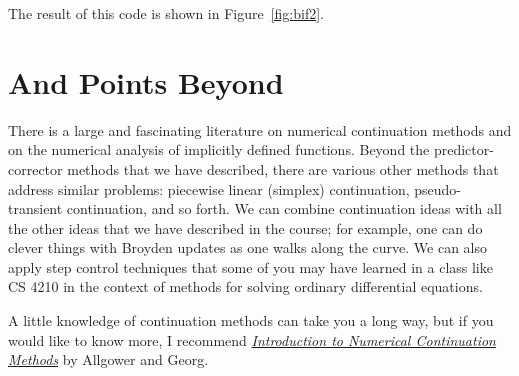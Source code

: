 \documentclass[12pt, leqno]{article} %
\begin{document}
The result of this code is shown in Figure~\ref{fig:bif2}.

\section{And Points Beyond}

There is a large and fascinating literature on numerical continuation
methods and on the numerical analysis of implicitly defined functions.
Beyond the predictor-corrector methods that we have described, there are
various other methods that address similar problems: piecewise linear
(simplex) continuation, pseudo-transient continuation, and so forth. We
can combine continuation ideas with all the other ideas that we have
described in the course; for example, one can do clever things with
Broyden updates as one walks along the curve. We can also apply step
control techniques that some of you may have learned in a class like CS
4210 in the context of methods for solving ordinary differential
equations.

A little knowledge of continuation methods can take you a long way, but
if you would like to know more, I recommend
\href{https://doi.org/10.1137/1.9780898719154}{\emph{Introduction to
Numerical Continuation Methods}} by Allgower and Georg.
\end{document}
